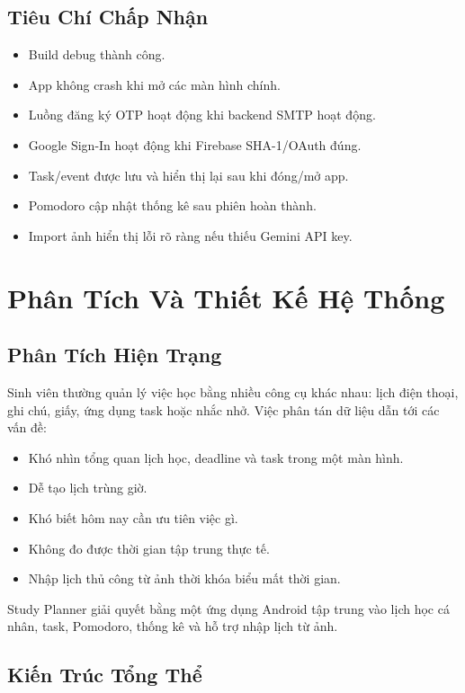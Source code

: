 \documentclass[12pt,a4paper]{report}
\begin{document}
\section{Tiêu Chí Chấp Nhận}

\begin{itemize}
\item Build debug thành công.
\item App không crash khi mở các màn hình chính.
\item Luồng đăng ký OTP hoạt động khi backend SMTP hoạt động.
\item Google Sign-In hoạt động khi Firebase SHA-1/OAuth đúng.
\item Task/event được lưu và hiển thị lại sau khi đóng/mở app.
\item Pomodoro cập nhật thống kê sau phiên hoàn thành.
\item Import ảnh hiển thị lỗi rõ ràng nếu thiếu Gemini API key.
\end{itemize}
\clearpage
\chapter{Phân Tích Và Thiết Kế Hệ Thống}

\section{Phân Tích Hiện Trạng}

Sinh viên thường quản lý việc học bằng nhiều công cụ khác nhau: lịch điện thoại, ghi chú, giấy, ứng dụng task hoặc nhắc nhở. Việc phân tán dữ liệu dẫn tới các vấn đề:

\begin{itemize}
\item Khó nhìn tổng quan lịch học, deadline và task trong một màn hình.
\item Dễ tạo lịch trùng giờ.
\item Khó biết hôm nay cần ưu tiên việc gì.
\item Không đo được thời gian tập trung thực tế.
\item Nhập lịch thủ công từ ảnh thời khóa biểu mất thời gian.
\end{itemize}

Study Planner giải quyết bằng một ứng dụng Android tập trung vào lịch học cá nhân, task, Pomodoro, thống kê và hỗ trợ nhập lịch từ ảnh.

\section{Kiến Trúc Tổng Thể}
\end{document}
